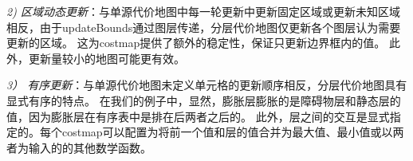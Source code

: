 \emph{\color{blue}2) 区域动态更新}：与单源代价地图中每一轮更新中更新固定区域或更新未知区域相反，由于updateBounds通过图层传递，分层代价地图仅更新各个图层认为需要更新的区域。 这为costmap提供了额外的稳定性，保证只更新边界框内的值。 此外，更新量较小的地图可能更有效。



\emph{\color{blue}3） 有序更新}：与单源代价地图未定义单元格的更新顺序相反，分层代价地图具有显式有序的特点。 在我们的例子中，显然，膨胀层膨胀的是障碍物层和静态层的值，因为膨胀层在有序表中是排在后两者之后的。 此外，层之间的交互是显式指定的。每个costmap可以配置为将前一个值和层的值合并为最大值、最小值或以两者为输入的的其他数学函数。


